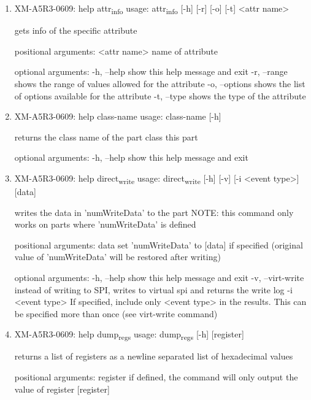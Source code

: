 \documentclass[11pt]{article}
\begin{document}
\begin{enumerate}
\item XM-A5R3-0609: help attr\textsubscript{info}
\label{sec:org501b2da}
usage: attr\textsubscript{info} [-h] [-r] [-o] [-t] <attr name>

gets info of the specific attribute

positional arguments:
  <attr name>    name of attribute

optional arguments:
  -h, --help     show this help message and exit
  -r, --range    shows the range of values allowed for the attribute
  -o, --options  shows the list of options available for the attribute
  -t, --type     shows the type of the attribute

\item XM-A5R3-0609: help class-name
\label{sec:orgdd89f21}
usage: class-name [-h]

returns the class name of the part class this part

optional arguments:
  -h, --help  show this help message and exit

\item XM-A5R3-0609: help direct\textsubscript{write}
\label{sec:orgd966a7f}
usage: direct\textsubscript{write} [-h] [-v] [-i <event type>] [data]

writes the data in 'numWriteData' to the part NOTE: this command only works on
parts where 'numWriteData' is defined

positional arguments:
  data              set 'numWriteData' to [data] if specified (original value
                    of 'numWriteData' will be restored after writing)

optional arguments:
  -h, --help        show this help message and exit
  -v, --virt-write  instead of writing to SPI, writes to virtual spi and
                    returns the write log
  -i <event type>   If specified, include only <event type> in the results.
                    This can be specified more than once (see virt-write
                    command)

\item XM-A5R3-0609: help dump\textsubscript{regs}
\label{sec:org44999ac}
usage: dump\textsubscript{regs} [-h] [register]

returns a list of registers as a newline separated list of hexadecimal values

positional arguments:
  register    if defined, the command will only output the value of register
              [register]


\end{enumerate}
\end{document}
